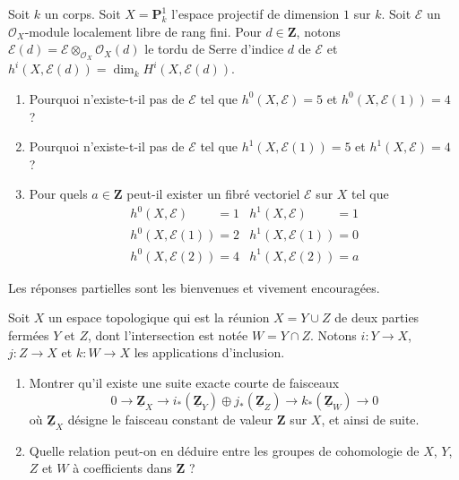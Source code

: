 \begin{exercise}
\label{exercise-can-there-be}
Soit $k$ un corps. Soit $X = \mathbf{P}^1_k$ l'espace projectif
de dimension $1$ sur $k$. Soit $\mathcal{E}$ un
$\mathcal{O}_X$-module localement libre de rang fini. Pour $d \in \mathbf{Z}$, notons
$\mathcal{E}(d) = \mathcal{E} \otimes_{\mathcal{O}_X} \mathcal{O}_X(d)$
le tordu de Serre d'indice $d$ de $\mathcal{E}$ et
$h^i(X, \mathcal{E}(d)) = \dim_k H^i(X, \mathcal{E}(d))$.
\begin{enumerate}
\item Pourquoi n'existe-t-il pas de $\mathcal{E}$ tel que
$h^0(X, \mathcal{E}) = 5$ et $h^0(X, \mathcal{E}(1)) = 4$ ?
\item Pourquoi n'existe-t-il pas de $\mathcal{E}$ tel que
$h^1(X, \mathcal{E}(1)) = 5$ et $h^1(X, \mathcal{E}) = 4$ ?
\item Pour quels $a \in \mathbf{Z}$ peut-il exister un fibré vectoriel
$\mathcal{E}$ sur $X$ tel que
$$
\begin{matrix}
h^0(X, \mathcal{E})\phantom{(1)} = 1 &
h^1(X, \mathcal{E})\phantom{(1)} = 1 \\
h^0(X, \mathcal{E}(1)) = 2 &
h^1(X, \mathcal{E}(1)) = 0 \\
h^0(X, \mathcal{E}(2)) = 4 &
h^1(X, \mathcal{E}(2)) = a
\end{matrix}
$$
\end{enumerate}
Les réponses partielles sont les bienvenues et vivement encouragées.
\end{exercise}

\begin{exercise}
\label{exercise-banana}
Soit $X$ un espace topologique qui est la réunion
$X = Y \cup Z$ de deux parties fermées
$Y$ et $Z$, dont l'intersection est notée $W = Y \cap Z$.
Notons $i : Y \to X$, $j : Z \to X$ et $k : W \to X$ les applications
d'inclusion.
\begin{enumerate}
\item Montrer qu'il existe une suite exacte courte de faisceaux
$$
0 \to \underline{\mathbf{Z}}_X \to
i_*(\underline{\mathbf{Z}}_Y) \oplus
j_*(\underline{\mathbf{Z}}_Z) \to
k_*(\underline{\mathbf{Z}}_W) \to 0
$$
où $\underline{\mathbf{Z}}_X$ désigne le faisceau constant
de valeur $\mathbf{Z}$ sur $X$, et ainsi de suite.
\item Quelle relation peut-on en déduire entre les
groupes de cohomologie de $X$, $Y$, $Z$ et $W$ à coefficients dans $\mathbf{Z}$ ?
\end{enumerate}
\end{exercise}

